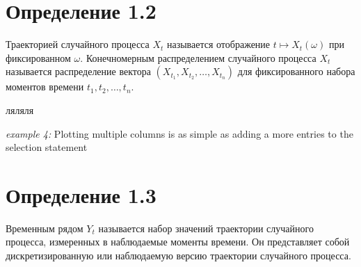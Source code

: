 \section*{Определение 1.2}
Траекторией случайного процесса \( X_t \)
называется отображение \( t \mapsto X_t(\omega) \) при
фиксированном \( \omega \).
Конечномерным распределением случайного процесса \( X_t \)
называется распределение вектора \( (X_{t_1}, X_{t_2}, \ldots,
X_{t_n}) \) для фиксированного набора моментов
времени \( t_1, t_2, \ldots, t_n \).


 {ляляля}








\noindent
\begin{minipage}{\linewidth}

  \noindent\textit{example 4:} Plotting multiple columns is as simple
  as adding a more entries to the selection statement

  
\end{minipage}

\section*{Определение 1.3} Временным рядом \( Y_t \) называется
набор значений траектории случайного процесса,
измеренных в наблюдаемые моменты времени. Он представляет собой
дискретизированную или наблюдаемую версию траектории случайного процесса.

